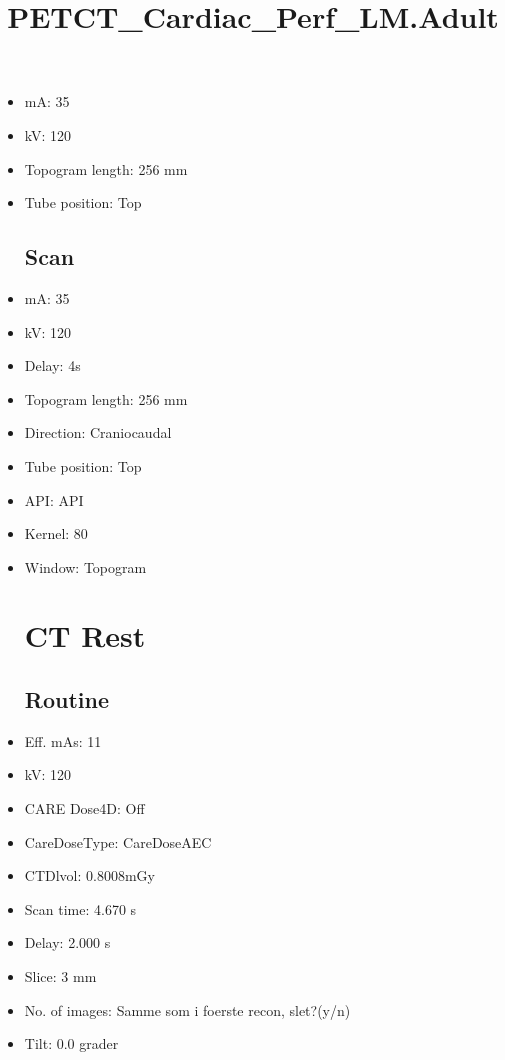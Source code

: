 \documentclass[12pt]{article}
\title{PETCT\_Cardiac\_Perf\_LM.Adult}
\begin{document}
\maketitle
\newpage
\tableofcontents
\newpage
{}


\begin{itemize}\section{Topogram}
\subsection{Routine}
\item mA: 35\item kV: 120\item Topogram length: 256 mm\item Tube position: Top
\subsection{Scan}\item mA: 35\item kV: 120\item Delay: 4s\item Topogram length: 256 mm\item Direction: Craniocaudal\item Tube position: Top\item API: API \item Kernel: 80\item Window: Topogram
\section{CT Rest}
\subsection{Routine}
\item Eff. mAs: 11\item kV: 120\item CARE Dose4D: Off\item CareDoseType: CareDoseAEC\item CTDlvol: 0.8008mGy\item Scan time: 4.670 s\item Delay: 2.000 s\item Slice: 3 mm\item No. of images: Samme som i foerste recon, slet?(y/n)\item Tilt: 0.0 grader

\end{itemize}
\end{document}
